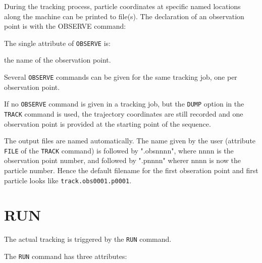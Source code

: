 During the tracking process, particle coordinates at specific named
locations along the machine can be printed to file(s). The declaration of
an observation point is with the OBSERVE command: 


The single attribute of \texttt{OBSERVE} is:
\begin{madlist}
   the name of the observation point. 
\end{madlist}
  
Several \texttt{OBSERVE} commands can be given for the same tracking
job, one per observation point. 

If no \texttt{OBSERVE} command is given in a tracking job, but the
\texttt{DUMP} option in the \texttt{TRACK} command is used, the
trajectory coordinates are still recorded and one observation point is
provided at the starting point of the sequence. 
     
The output files are named automatically. The name given by
the user (attribute \texttt{FILE} of the \texttt{TRACK} command) is
followed by ".obsnnnn", where nnnn is the observation point number, and followed by 
".pnnnn"  wherer nnnn is now the particle number. Hence the default
filename for the first obseration point and first particle looks like
\texttt{track.obs0001.p0001}.


\section{RUN}
\label{sec:run}

The actual tracking is triggered by the \texttt{RUN} command.


The \texttt{RUN} command has three attributes:


